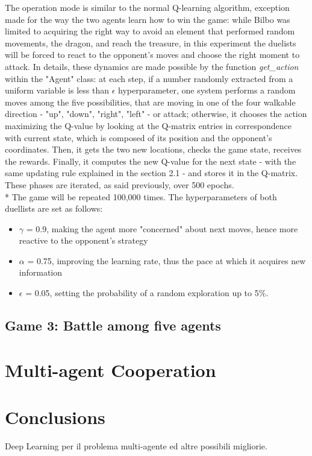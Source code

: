 The operation mode is similar to the normal Q-learning algorithm, exception made for the way the two agents learn how to win the game: while Bilbo was limited to acquiring the right way to avoid an element that performed random movements, the dragon, and reach the treasure, in this experiment the duelists will be forced to react to the opponent's moves and choose the right moment to attack. In details, these dynamics are made possible by the function \textit{get\_action} within the "Agent" class:  at each step, if a number randomly extracted from a uniform variable is less than $\epsilon$ hyperparameter, one system performs a random moves among the five possibilities, that are moving in one of the four walkable direction - "up", "down", "right", "left" - or attack; otherwise, it chooses the action maximizing the Q-value by looking at the Q-matrix entries in correspondence with current state, which is composed of its position and the opponent's coordinates. Then, it gets the two new locations, checks the game state, receives the rewards. Finally, it computes the new Q-value for the next state - with the same updating rule explained in the section 2.1 - and stores it in the Q-matrix. These phases are iterated, as said previously, over 500 epochs.\\*
The game will be repeated 100,000 times. The hyperparameters of both duellists are set as follows:
\begin{itemize}
  \item $\gamma$ = 0.9, making the agent more "concerned" about next moves, hence more reactive to the opponent's strategy
  \item $\alpha$ = 0.75, improving the learning rate, thus the pace at which it acquires new information
  \item $\epsilon$ = 0.05, setting the probability of a random exploration up to 5\%.
\end{itemize} 
\subsection{Game 3: Battle among five agents}


\section{Multi-agent Cooperation}

\section{Conclusions}
Deep Learning per il problema multi-agente ed altre possibili migliorie.






